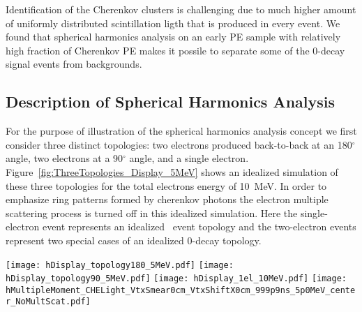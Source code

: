 Identification of the Cherenkov clusters is challenging due to much higher amount of uniformly distributed scintillation ligth that is
produced in every event. We found that spherical harmonics analysis on an early PE sample with relatively high fraction of 
Cherenkov PE makes it possile to separate some of the 0\nbb-decay signal events from backgrounds.

\subsection{Description of Spherical Harmonics Analysis}

For the purpose of illustration of the spherical harmonics analysis concept we first consider three distinct topologies: 
two electrons produced back-to-back at an 180$^{\circ}$ angle, two electrons at a 90$^{\circ}$ angle, and a single electron.
Figure~\ref{fig:ThreeTopologies_Display_5MeV} shows an idealized simulation of these three topologies for the total electrons 
energy of 10~MeV. In order to emphasize ring patterns formed by cherenkov photons the electron multiple scattering process is turned off
in this idealized simulation. Here the single-electron event represents an idealized \B~event topology and the two-electron events represent
two special cases of an idealized 0\nbb-decay topology.


\begin{figure*}[h]
  \centering
  \texttt{[image: hDisplay\_topology180\_5MeV.pdf]}
  \texttt{[image: hDisplay\_topology90\_5MeV.pdf]}
  \texttt{[image: hDisplay\_1el\_10MeV.pdf]}
  \texttt{[image: hMultipleMoment\_CHELight\_VtxSmear0cm\_VtxShiftX0cm\_999p9ns\_5p0MeV\_center\_NoMultScat.pdf]}
  \caption{\emph{Top pannels and bottom left pannel:} Idealized event displays for the three representative event topologies: two back-to-back
    5~MeV electrons (\emph{top left}), two 5~MeV electrons at 90$^{\circ}$ angle (\emph{top right}), and a single 10~MeV electron
    (\emph{bottom right}). Multiple scattering is turned off in the simulation to emphasize the difference in the mutual orientation of
    cherenkov rings for the three topologies. For the illustration purposes 100\% QE is applied to cherenkov photons (triangles)
    and the default QE is applied to scintillation photons (dots). All electrons originate at the center of the
    detector. One typical event is shown for each topology.
    \emph{Bottom right pannel:} Normalized power spectrum $S_l$ calculated for distribution of cherenkov photons only. The three
    topologies are compared: two back-to-back 5~MeV electrons (\emph{solid red line}), two 5~MeV electrons at 90$^{\circ}$ angle
    (\emph{dotted magenta line}), and a single 10~MeV electron (\emph{dashed blue line}).}
  \label{fig:ThreeTopologies_Display_5MeV}
\end{figure*}



